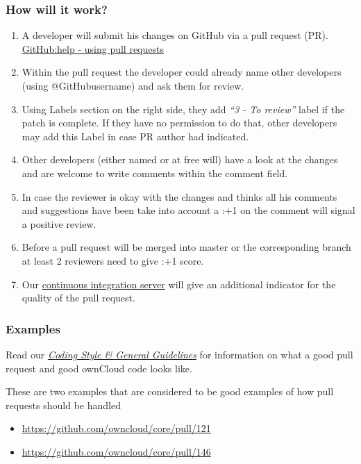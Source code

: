 \documentclass[letterpaper,10pt,english]{sphinxmanual}
\begin{document}
\subsubsection{How will it work?}
\label{bugtracker/codereviews:how-will-it-work}\begin{enumerate}
\item {} 
A developer will submit his changes on GitHub via a pull request (PR).
\href{https://help.GitHub.com/articles/using-pull-requests}{GitHub:help - using pull requests}

\item {} 
Within the pull request the developer could already name other developers (using
@GitHubusername) and ask them for review.

\item {} 
Using Labels section on the right side, they add \emph{``3 - To review''} label if the patch is
complete. If they have no permission to do that, other developers may add this Label in case
PR author had indicated.

\item {} 
Other developers (either named or at free will) have a look at the changes
and are welcome to write comments within the comment field.

\item {} 
In case the reviewer is okay with the changes and thinks all his comments and
suggestions have been take into account a :+1 on the comment will signal a positive
review.

\item {} 
Before a pull request will be merged into master or the corresponding
branch at least 2 reviewers need to give :+1 score.

\item {} 
Our \href{https://ci.owncloud.org/}{continuous integration server} will give an additional indicator for
the quality of the pull request.

\end{enumerate}


\subsubsection{Examples}
\label{bugtracker/codereviews:examples}
Read our {\hyperref[general/codingguidelines:coding-style-guidelines-label]{\emph{Coding Style \& General Guidelines}}} for information on what a good pull request and
good ownCloud code looks like.

These are two examples that are considered to be good examples of how pull
requests should be handled
\begin{itemize}
\item {} 
\href{https://github.com/owncloud/core/pull/121}{https://github.com/owncloud/core/pull/121}

\item {} 
\href{https://github.com/owncloud/core/pull/146}{https://github.com/owncloud/core/pull/146}

\end{itemize}
\end{document}
